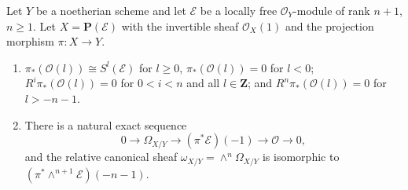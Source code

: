 Let $Y$ be a noetherian scheme and let $\mathcal{E}$ be a locally free $\mathcal{O}_Y$-module of rank $n + 1$, $n \geqslant 1$. Let $X = \mathbf{P}(\mathcal{E})$ with the invertible sheaf $\mathcal{O}_X(1)$ and the projection morphism $\pi: X \to Y$.
\begin{enumerate}
\item[(a)] $\pi_*(\mathcal{O}(l)) \cong S^l(\mathcal{E})$ for $l \geqslant 0$, $\pi_*(\mathcal{O}(l)) = 0$ for $l < 0$; $R^i \pi_*(\mathcal{O}(l)) = 0$ for $0 < i < n$ and all $l \in \mathbf{Z}$; and $R^n \pi_*(\mathcal{O}(l)) = 0$ for $l > -n - 1$.
\item[(b)] There is a natural exact sequence
$$0 \to \Omega_{X/Y} \to (\pi^*\mathcal{E})(-1) \to \mathcal{O} \to 0,$$
and the relative canonical sheaf $\omega_{X/Y} = \wedge^n \Omega_{X/Y}$ is isomorphic to $(\pi^* \wedge^{n+1} \mathcal{E})(-n - 1)$.
\end{enumerate}
